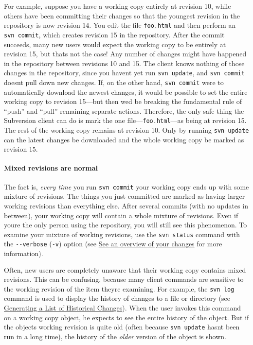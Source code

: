 For example, suppose you have a working copy entirely at revision 10,
while others have been committing their changes so that the youngest
revision in the repository is now revision 14. You edit the file
\texttt{foo.html} and then perform an \texttt{svn\ commit}, which
creates revision 15 in the repository. After the commit succeeds, many
new users would expect the working copy to be entirely at revision 15,
but that\textquotesingle s not the case! Any number of changes might
have happened in the repository between revisions 10 and 15. The client
knows nothing of those changes in the repository, since you
haven\textquotesingle t yet run \texttt{svn\ update}, and
\texttt{svn\ commit} doesn\textquotesingle t pull down new changes. If,
on the other hand, \texttt{svn\ commit} were to automatically download
the newest changes, it would be possible to set the entire working copy
to revision 15---but then we\textquotesingle d be breaking the
fundamental rule of ``push'' and ``pull'' remaining separate actions.
Therefore, the only safe thing the Subversion client can do is mark the
one file---\texttt{foo.html}---as being at revision 15. The rest of the
working copy remains at revision 10. Only by running
\texttt{svn\ update} can the latest changes be downloaded and the whole
working copy be marked as revision 15.

\paragraph{Mixed revisions are
normal}\label{svn.basic.in-action.mixedrevs.normal}

The fact is, \emph{every time} you run \texttt{svn\ commit} your working
copy ends up with some mixture of revisions. The things you just
committed are marked as having larger working revisions than everything
else. After several commits (with no updates in between), your working
copy will contain a whole mixture of revisions. Even if
you\textquotesingle re the only person using the repository, you will
still see this phenomenon. To examine your mixture of working revisions,
use the \texttt{svn\ status} command with the \texttt{-\/-verbose}
(\texttt{-v}) option (see \hyperref[svn.tour.cycle.examine.status]{See
an overview of your changes} for more information).

Often, new users are completely unaware that their working copy contains
mixed revisions. This can be confusing, because many client commands are
sensitive to the working revision of the item they\textquotesingle re
examining. For example, the \texttt{svn\ log} command is used to display
the history of changes to a file or directory (see
\hyperref[svn.tour.history.log]{Generating a List of Historical
Changes}). When the user invokes this command on a working copy object,
he expects to see the entire history of the object. But if the
object\textquotesingle s working revision is quite old (often because
\texttt{svn\ update} hasn\textquotesingle t been run in a long time),
the history of the \emph{older} version of the object is shown.

